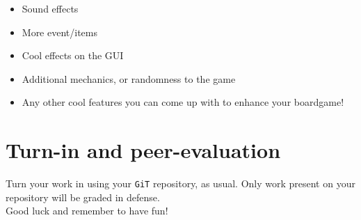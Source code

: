 \documentclass{42-en}
\begin{document}
	\begin{itemize}
		\item Sound effects
		\item More event/items
		\item Cool effects on the GUI
		\item Additional mechanics, or randomness to the game
		\item Any other cool features you can come up with to enhance
		your boardgame!
	\end{itemize}


\chapter{Turn-in and peer-evaluation}

    Turn your work in using your \texttt{GiT} repository, as
    usual. Only work present on your repository will be graded in defense.\\

	Good luck and remember to have fun!



\end{document}
